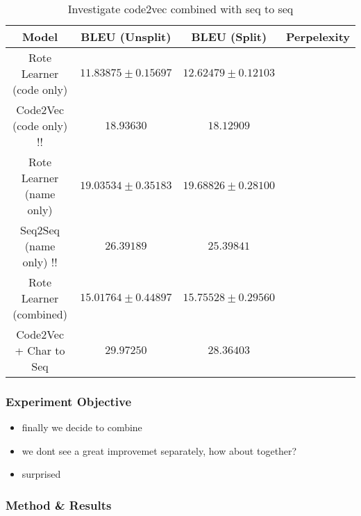 \begin{table}[h!]
\begin{center}
\begin{tabular}{ c | c | c | c }
    Model                             & BLEU (Unsplit)  & BLEU (Split)    & Perpelexity \\
    \hline
    Rote Learner  (code only)        & $ 11.83875 \pm  0.15697 $ & $ 12.62479 \pm 0.12103 $ & \\
    Code2Vec  (code only)         !!    & $ 18.93630 $ & $ 18.12909 $ & \\
    \hline
    \hline
    Rote Learner  (name only)         & $ 19.03534 \pm  0.35183 $ & $ 19.68826 \pm 0.28100 $ & \\
    Seq2Seq  (name only)      !!         & $ 26.39189 $ & $ 25.39841 $ & \\
    \hline
    \hline
    Rote Learner (combined)            & $ 15.01764 \pm  0.44897 $ & $ 15.75528 \pm 0.29560 $ & \\
    Code2Vec  + Char to Seq           & $ 29.97250 $ & $ 28.36403 $ & \\
    \hline
\end{tabular}
\caption {Investigate code2vec combined with seq to seq}
\label{table:code2vec_embed}
\end{center}
\end{table}

\subsubsection{Experiment Objective} %

\begin{itemize}
    \item finally we decide to combine
    \item we dont see a great improvemet separately, how about together?
    \item surprised
\end{itemize}


\subsubsection{Method \& Results} %

